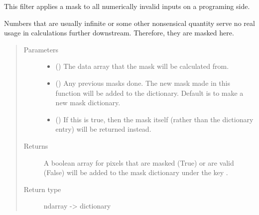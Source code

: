 \documentclass[letterpaper,10pt,english]{sphinxmanual}
\begin{document}
\begin{fulllineitems}
\label{\detokenize{python_docstrings/IfA_Smeargle.echo.masks.masks_echo000:IfA_Smeargle.echo.masks.masks_echo000.echo010_fixing_invalids}}
This filter applies a mask to all numerically invalid inputs on a programing side.

Numbers that are usually infinite or some other nonsensical quantity serve no real usage in
calculations further downstream. Therefore, they are masked here.
\begin{quote}\begin{description}
\item[{Parameters}] \leavevmode\begin{itemize}
\item {} 
 () \textendash{} The data array that the mask will be calculated from.

\item {} 
 (\sphinxstyleliteralemphasis{\sphinxupquote{ (}}\sphinxstyleliteralemphasis{\sphinxupquote{)}}) \textendash{} Any previous masks done. The new mask made in this function will be added to the
dictionary. Default is to make a new mask dictionary.

\item {} 
 (\sphinxstyleliteralemphasis{\sphinxupquote{ (}}\sphinxstyleliteralemphasis{\sphinxupquote{)}}) \textendash{} If this is true, then the mask itself (rather than the dictionary entry) will be
returned instead.

\end{itemize}

\item[{Returns}] \leavevmode
{} \textendash{} A boolean array for pixels that are masked (True) or are valid (False) will be added to
the mask dictionary under the key .

\item[{Return type}] \leavevmode
ndarray -\textgreater{} dictionary

\end{description}\end{quote}

\end{fulllineitems}
\end{document}
